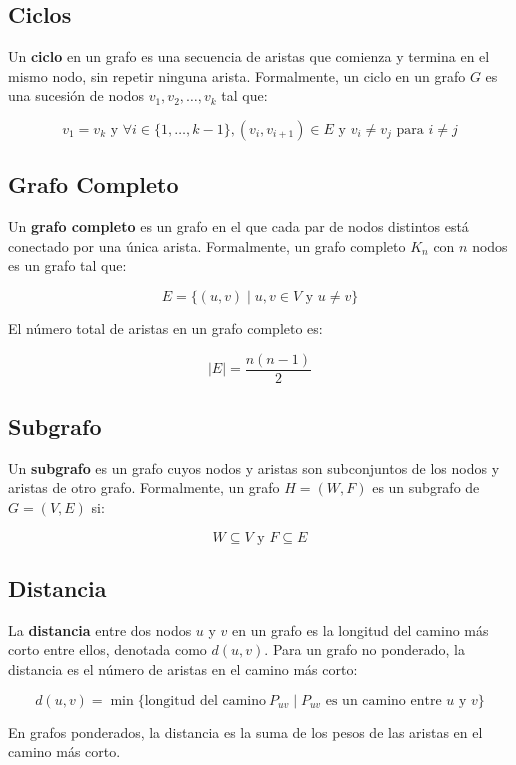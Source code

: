 \subsection{Ciclos}

Un \textbf{ciclo} en un grafo es una secuencia de aristas que comienza y termina en el mismo nodo, sin repetir ninguna arista. Formalmente, un ciclo en un grafo \( G \) es una sucesión de nodos \( v_1, v_2, \ldots, v_k \) tal que:

\[
v_1 = v_k \text{ y } \forall i \in \{1, \ldots, k-1\}, (v_i, v_{i+1}) \in E \text{ y } v_i \neq v_j \text{ para } i \neq j
\]

\subsection{Grafo Completo}

Un \textbf{grafo completo} es un grafo en el que cada par de nodos distintos está conectado por una única arista. Formalmente, un grafo completo \( K_n \) con \( n \) nodos es un grafo tal que:

\[
E = \{ (u, v) \mid u, v \in V \text{ y } u \neq v \}
\]

El número total de aristas en un grafo completo es:

\[
|E| = \frac{n(n-1)}{2}
\]

\subsection{Subgrafo}

Un \textbf{subgrafo} es un grafo cuyos nodos y aristas son subconjuntos de los nodos y aristas de otro grafo. Formalmente, un grafo \( H = (W, F) \) es un subgrafo de \( G = (V, E) \) si:

\[
W \subseteq V \text{ y } F \subseteq E
\]

\subsection{Distancia}

La \textbf{distancia} entre dos nodos \( u \) y \( v \) en un grafo es la longitud del camino más corto entre ellos, denotada como \( d(u,v) \). Para un grafo no ponderado, la distancia es el número de aristas en el camino más corto:

\[
d(u,v) = \min \{ \text{longitud del camino} \ P_{uv} \mid P_{uv} \text{ es un camino entre } u \text{ y } v \}
\]

En grafos ponderados, la distancia es la suma de los pesos de las aristas en el camino más corto.


